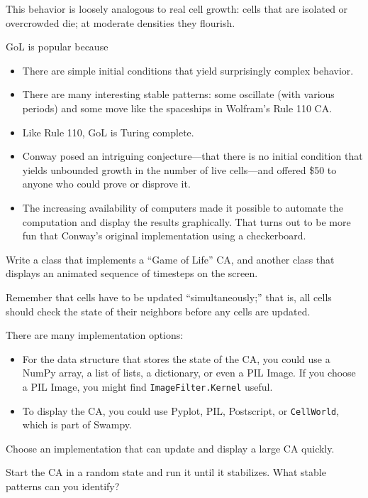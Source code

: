 \documentclass[10pt]{book}
\begin{document}
This behavior is loosely analogous to real cell growth: cells
that are isolated or overcrowded die; at moderate densities they
flourish.

GoL is popular because

\begin{itemize}

\item There are simple initial conditions that yield
surprisingly complex behavior.

\item There are many interesting stable patterns: some
oscillate (with various periods) and some move like the
spaceships in Wolfram's Rule 110 CA.

\item Like Rule 110, GoL is Turing complete.

\item Conway posed an intriguing conjecture---that there is
no initial condition that yields unbounded growth in the number
of live cells---and offered \$50 to anyone who could prove
or disprove it.

\item The increasing availability of computers made it possible
to automate the computation and display the results graphically.
That turns out to be more fun that Conway's original implementation
using a checkerboard.

\end{itemize}


\begin{ex}

Write a class that implements a ``Game of Life'' CA, and another
class that displays an animated sequence of timesteps on the screen.

Remember that cells have to be updated ``simultaneously;'' 
that is, all cells should check the state of their neighbors
before any cells are updated.

There are many implementation options:

\begin{itemize}

\item For the data structure that stores the state of the CA, you
could use a NumPy array, a list of lists, a dictionary, or even
a PIL Image.  If you choose a PIL Image, you might find
{\tt ImageFilter.Kernel} useful.

\item To display the CA, you could use Pyplot, PIL, Postscript, or
{\tt CellWorld}, which is part of Swampy.

\end{itemize}

Choose an implementation that can update and display a large CA
quickly.

Start the CA in a random state and run it until it stabilizes.
What stable patterns can you identify?

\end{ex}
\end{document}
